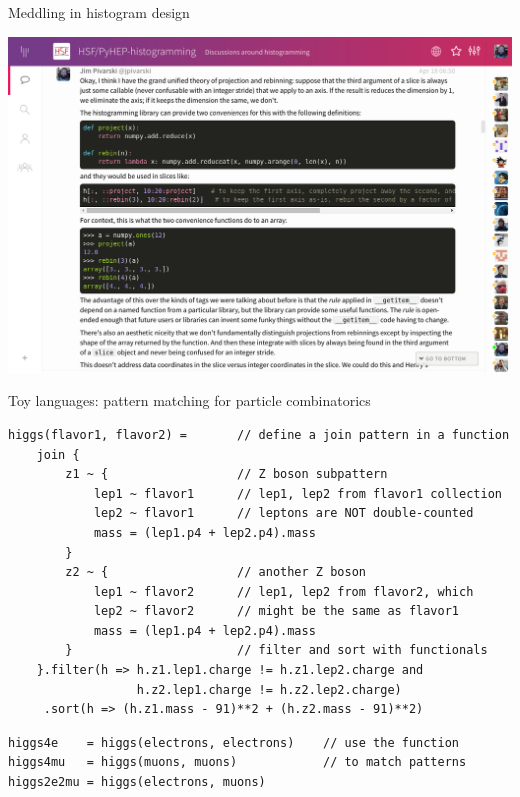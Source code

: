 \documentclass[aspectratio=169]{beamer}
\begin{document}
\begin{frame}{Meddling in histogram design}
\vspace{-0.04 cm}

\begin{center}
\includegraphics[width=0.85\linewidth]{gitter-histogramming.png}
\end{center}
\end{frame}

\begin{frame}[fragile]{Toy languages: pattern matching for particle combinatorics}
\small
\begin{verbatim}
higgs(flavor1, flavor2) =       // define a join pattern in a function
    join {
        z1 ~ {                  // Z boson subpattern
            lep1 ~ flavor1      // lep1, lep2 from flavor1 collection
            lep2 ~ flavor1      // leptons are NOT double-counted
            mass = (lep1.p4 + lep2.p4).mass
        }
        z2 ~ {                  // another Z boson
            lep1 ~ flavor2      // lep1, lep2 from flavor2, which
            lep2 ~ flavor2      // might be the same as flavor1
            mass = (lep1.p4 + lep2.p4).mass
        }                       // filter and sort with functionals
    }.filter(h => h.z1.lep1.charge != h.z1.lep2.charge and
                  h.z2.lep1.charge != h.z2.lep2.charge)
     .sort(h => (h.z1.mass - 91)**2 + (h.z2.mass - 91)**2)
\end{verbatim}
\begin{verbatim}
higgs4e    = higgs(electrons, electrons)    // use the function
higgs4mu   = higgs(muons, muons)            // to match patterns
higgs2e2mu = higgs(electrons, muons)
\end{verbatim}
\end{frame}
\end{document}
